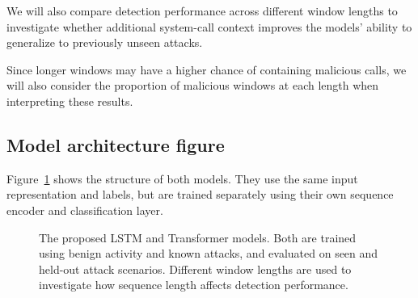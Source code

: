 \documentclass{article}
\begin{document}
We will also compare detection performance across
different window lengths to investigate whether
additional system-call context improves the models'
ability to generalize to previously unseen attacks.

Since longer windows may have a higher chance of
containing malicious calls, we will also consider
the proportion of malicious windows at each length
when interpreting these results.

\subsection{Model architecture figure}
\label{model:figure}

Figure~\ref{fig:model_pipeline} shows the structure of
both models. They use the same input representation
and labels, but are trained separately using their
own sequence encoder and classification layer.

\begin{figure}[t]
\centering
{}

\caption{The proposed LSTM and Transformer models.
Both are trained using benign activity and known attacks,
and evaluated on seen and held-out attack scenarios.
Different window lengths are used to investigate how
sequence length affects detection performance.}

\label{fig:model_pipeline}
\end{figure}
\end{document}
